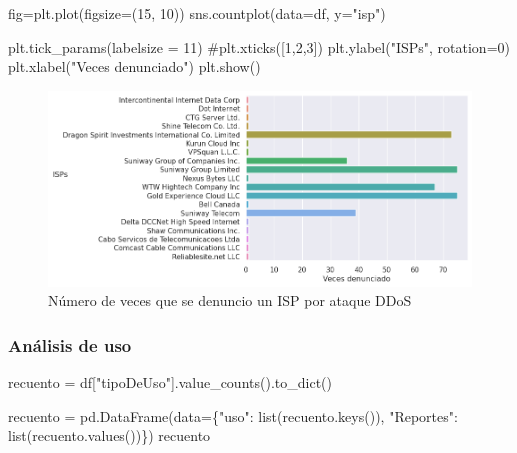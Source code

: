 \documentclass[
  letterpaper,
  DIV=11,
  numbers=noendperiod]{scrartcl}
\newenvironment{Shaded}{\begin{snugshade}}{\end{snugshade}}
\newcommand{\BuiltInTok}[1]{\textcolor[rgb]{0.00,0.23,0.31}{#1}}
\newcommand{\CommentTok}[1]{\textcolor[rgb]{0.37,0.37,0.37}{#1}}
\newcommand{\DecValTok}[1]{\textcolor[rgb]{0.68,0.00,0.00}{#1}}
\newcommand{\NormalTok}[1]{\textcolor[rgb]{0.00,0.23,0.31}{#1}}
\newcommand{\OperatorTok}[1]{\textcolor[rgb]{0.37,0.37,0.37}{#1}}
\newcommand{\StringTok}[1]{\textcolor[rgb]{0.13,0.47,0.30}{#1}}
\begin{document}
\begin{Shaded}
\begin{Highlighting}[]
\NormalTok{fig}\OperatorTok{=}\NormalTok{plt.plot(figsize}\OperatorTok{=}\NormalTok{(}\DecValTok{15}\NormalTok{, }\DecValTok{10}\NormalTok{))}
\NormalTok{sns.countplot(data}\OperatorTok{=}\NormalTok{df, y}\OperatorTok{=}\StringTok{"isp"}\NormalTok{)}


    
\NormalTok{plt.tick\_params(labelsize }\OperatorTok{=} \DecValTok{11}\NormalTok{)}
\CommentTok{\#plt.xticks([1,2,3])}
\NormalTok{plt.ylabel(}\StringTok{"ISPs"}\NormalTok{, rotation}\OperatorTok{=}\DecValTok{0}\NormalTok{)}
\NormalTok{plt.xlabel(}\StringTok{"Veces denunciado"}\NormalTok{)}
\NormalTok{plt.show()}
\end{Highlighting}
\end{Shaded}

\begin{figure}[H]

{\centering \includegraphics{Análisis_files/figure-pdf/fig-ispsddos-output-1.png}

}

\caption{\label{fig-ispsddos}Número de veces que se denuncio un ISP por
ataque DDoS}

\end{figure}

\hypertarget{anuxe1lisis-de-uso-1}{%
\subsubsection{Análisis de uso}\label{anuxe1lisis-de-uso-1}}

\begin{Shaded}
\begin{Highlighting}[]
\NormalTok{recuento }\OperatorTok{=}\NormalTok{ df[}\StringTok{"tipoDeUso"}\NormalTok{].value\_counts().to\_dict()}

\NormalTok{recuento }\OperatorTok{=}\NormalTok{ pd.DataFrame(data}\OperatorTok{=}\NormalTok{\{}\StringTok{"uso"}\NormalTok{: }\BuiltInTok{list}\NormalTok{(recuento.keys()), }\StringTok{"Reportes"}\NormalTok{: }\BuiltInTok{list}\NormalTok{(recuento.values())\})}
\NormalTok{recuento}
\end{Highlighting}
\end{Shaded}
\end{document}

